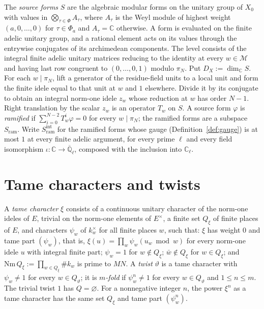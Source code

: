 \documentclass[reqno]{amsart}
\theoremstyle{plain}
\theoremstyle{definition}
\newcommand{\Q}{{\mathbb{Q}}}
\newcommand{\C}{{\mathbb{C}}}
\begin{document}
The \emph{source forms} \(S\) are the algebraic modular forms on the unitary group of \(X_0\) with values in \(\bigotimes_{\tau\in\Phi} A_\tau\), where \(A_\tau\) is the Weyl module of highest weight \((a,0,\dots,0)\) for \(\tau\in\Phi_a\) and \(A_\tau=\C\) otherwise.  A form is evaluated on the finite adelic unitary group, and a rational element acts on its values through the entrywise conjugates of its archimedean components.  The level consists of the integral finite adelic unitary matrices reducing to the identity at every \(w\in\mathcal M\) and having last row congruent to \((0,\dots,0,1)\) modulo \(\pi_N\).  Put \(D_X := \dim_\C S\).  For each \(w \mid \pi_N\), lift a generator of the residue-field units to a local unit and form the finite idele equal to that unit at \(w\) and \(1\) elsewhere.  Divide it by its conjugate to obtain an integral norm-one idele \(z_w\) whose reduction at \(w\) has order \(N - 1\).  Right translation by the scalar \(z_w\) is an operator \(T_w\) on \(S\).  A source form \(\varphi\) is \emph{ramified} if \(\sum_{i=0}^{N-2} T_w^i\varphi = 0\) for every \(w \mid \pi_N\); the ramified forms are a subspace \(S_{\mathrm{ram}}\).  Write \(S_{\mathrm{ram}}^{\mathrm{int}}\) for the ramified forms whose gauge (Definition~\ref{def:gauge}) is at most \(1\) at every finite adelic argument, for every prime \(\ell\) and every field isomorphism \(\iota\colon\C\to\overline{\Q}_\ell\), composed with the inclusion into \(\C_\ell\).

\section{Tame characters and twists}\label{sec:twists}

A \emph{tame character} \(\xi\) consists of a continuous unitary character of the norm-one ideles of \(E\), trivial on the norm-one elements of \(E^\times\), a finite set \(Q_\xi\) of finite places of \(E\), and characters \(\psi_w\) of \(k_w^\times\) for all finite places \(w\), such that: \(\xi\) has weight \(0\) and tame part \((\psi_w)\), that is, \(\xi(u) = \prod_w \psi_w(u_w \bmod w)\) for every norm-one idele \(u\) with integral finite part; \(\psi_w = 1\) for \(w \notin Q_\xi\); \(\bar w \notin Q_\xi\) for \(w \in Q_\xi\); and \(\mathrm{Nm}\,Q_\xi := \prod_{w \in Q_\xi} \#k_w\) is prime to \(MN\).  A \emph{twist} \(\vartheta\) is a tame character with \(\psi_w \ne 1\) for every \(w \in Q_\vartheta\); it is \emph{\(m\)-fold} if \(\psi_w^n \ne 1\) for every \(w \in Q_\vartheta\) and \(1 \le n \le m\).  The trivial twist \(1\) has \(Q = \varnothing\).  For a nonnegative integer \(n\), the power \(\xi^n\) as a tame character has the same set \(Q_\xi\) and tame part \((\psi_w^n)\).
\end{document}

